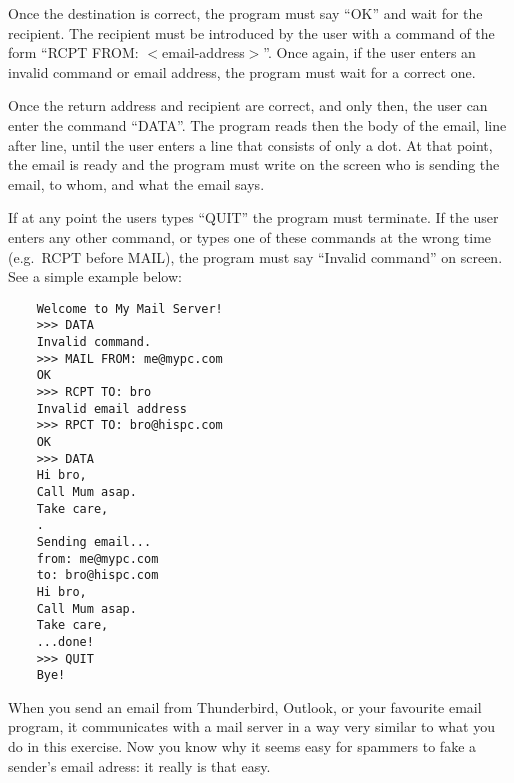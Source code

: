 \documentclass{article}
\begin{document}
Once the destination is correct, the program must say ``OK'' and wait
for the recipient. The recipient must be introduced by the user with a
command of the form ``RCPT FROM: $<$email-address$>$''. Once again, if
the user enters an invalid command or email address, the program must
wait for a correct one. 

Once the return address and recipient are correct, and only then, the
user can enter the command ``DATA''. The program reads then the body
of the email, line after line, until the user enters a line that
consists of only a dot. At that point, the email is ready and the
program must write on the screen who is sending the email, to whom,
and what the email says. 

If at any point the users types ``QUIT'' the program must
terminate. If the user enters any other command, or types one of these
commands at the wrong time (e.g.~RCPT before MAIL), the program must
say ``Invalid command'' on screen. See a simple example below: 

\begin{verbatim}
    Welcome to My Mail Server!
    >>> DATA
    Invalid command. 
    >>> MAIL FROM: me@mypc.com
    OK
    >>> RCPT TO: bro
    Invalid email address
    >>> RPCT TO: bro@hispc.com
    OK
    >>> DATA
    Hi bro, 
    Call Mum asap.
    Take care,
    .
    Sending email...
    from: me@mypc.com
    to: bro@hispc.com
    Hi bro, 
    Call Mum asap.
    Take care,
    ...done!
    >>> QUIT
    Bye!    
\end{verbatim}

When you send an email from Thunderbird, Outlook, or your favourite
email program, it communicates with a mail server in a way very
similar to what you do in this exercise. Now you know why it seems
easy for spammers to fake a sender's email adress: it
really is that easy.
\end{document}
